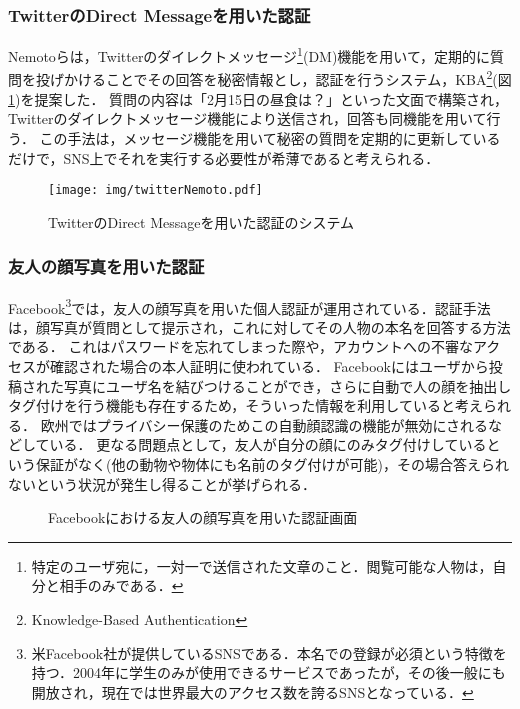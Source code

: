 \subsubsection{TwitterのDirect Messageを用いた認証}\label{subsec:twitterDMAuth}
Nemotoら\cite{nemoto:2006-03-15}は，Twitterのダイレクトメッセージ\footnote{特定のユーザ宛に，一対一で送信された文章のこと．閲覧可能な人物は，自分と相手のみである．}(DM)機能を用いて，定期的に質問を投げかけることでその回答を秘密情報とし，認証を行うシステム，KBA\footnote{Knowledge-Based Authentication}(図\ref{fig:twitterNemoto})を提案した．
質問の内容は「2月15日の昼食は？」といった文面で構築され，Twitterのダイレクトメッセージ機能により送信され，回答も同機能を用いて行う．
この手法は，メッセージ機能を用いて秘密の質問を定期的に更新しているだけで，SNS上でそれを実行する必要性が希薄であると考えられる．

\begin{figure}[ht]
  \begin{center}
    \texttt{[image: img/twitterNemoto.pdf]}
  \end{center}
  \caption{TwitterのDirect Messageを用いた認証のシステム}
  \label{fig:twitterNemoto}
\end{figure}

\subsubsection{友人の顔写真を用いた認証}\label{subsec:facebookFaceAuth}
Facebook\footnote{米Facebook社が提供しているSNSである．本名での登録が必須という特徴を持つ．2004年に学生のみが使用できるサービスであったが，その後一般にも開放され，現在では世界最大のアクセス数を誇るSNSとなっている．}では，友人の顔写真を用いた個人認証が運用されている．認証手法は，顔写真が質問として提示され，これに対してその人物の本名を回答する方法である．
これはパスワードを忘れてしまった際や，アカウントへの不審なアクセスが確認された場合の本人証明に使われている．
Facebookにはユーザから投稿された写真にユーザ名を結びつけることができ，さらに自動で人の顔を抽出しタグ付けを行う機能\cite{facebookTagging}も存在するため，そういった情報を利用していると考えられる．
欧州ではプライバシー保護のためこの自動顔認識の機能が無効にされるなどしている．
更なる問題点として，友人が自分の顔にのみタグ付けしているという保証がなく(他の動物や物体にも名前のタグ付けが可能)，その場合答えられないという状況が発生し得ることが挙げられる．

\begin{figure}[ht]
  \begin{center}
  \end{center}
  \caption{Facebookにおける友人の顔写真を用いた認証画面}
  \label{fig:facebookFaceAuth}
\end{figure}

